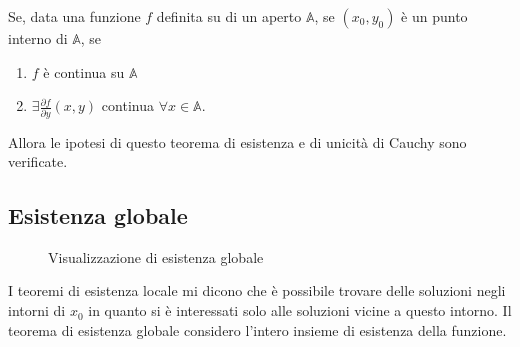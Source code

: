 \documentclass[a4paper, oneside]{book}
\begin{document}
    \begin{lemma}
        Se, data una funzione $f$ definita su di un aperto $\mathbb{A}$, se $(x_0, y_0)$ 
        è un punto interno di $\mathbb{A}$, se 
        \begin{enumerate}
            \item $f$ è continua su $\mathbb{A}$
            \item $\exists \frac{\partial f}{\partial y}(x, y)$ continua $\forall x \in \mathbb{A}$. 
        \end{enumerate}
        Allora le ipotesi di questo teorema di esistenza e di unicità di Cauchy sono verificate. 
    \end{lemma}

\subsection{Esistenza globale}
\begin{figure}
    \centering
    \caption{Visualizzazione di esistenza globale}
\end{figure}
I teoremi di esistenza locale mi dicono che è possibile trovare 
delle soluzioni negli intorni di $x_0$ in quanto si è interessati solo
alle soluzioni vicine a questo intorno. Il teorema di esistenza
globale considero l'intero insieme di esistenza della funzione. 
\end{document}
